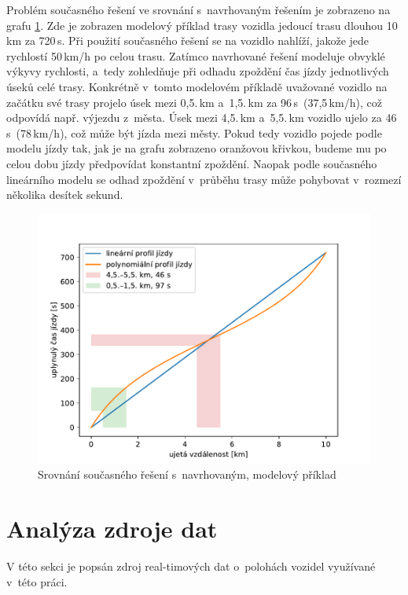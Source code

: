\bigbreak

Problém současného řešení ve srovnání s~navrhovaným řešením je zobrazeno na grafu \ref{fig:lin_vs_poly}. Zde je zobrazen modelový příklad trasy vozidla jedoucí trasu dlouhou 10\,km za 720\,s. Při použití současného řešení se na vozidlo nahlíží, jakože jede rychlostí 50\,km/h po celou trasu. Zatímco navrhované řešení modeluje obvyklé výkyvy rychlosti, a~tedy zohledňuje při odhadu zpoždění čas jízdy jednotlivých úseků celé trasy. Konkrétně v~tomto modelovém příkladě uvažované vozidlo na začátku své trasy projelo úsek mezi 0,5.\,km a~1,5.\,km za 96\,s~(37,5\,km/h), což odpovídá např. výjezdu z~města. Úsek mezi 4,5.\,km a~5,5.\,km vozidlo ujelo za 46\,s~(78\,km/h), což může být jízda mezi městy. Pokud tedy vozidlo pojede podle modelu jízdy tak, jak je na grafu zobrazeno oranžovou křivkou, budeme mu po celou dobu jízdy předpovídat konstantní zpoždění. Naopak podle současného lineárního modelu se odhad zpoždění v~průběhu trasy může pohybovat v~rozmezí několika desítek sekund.

\begin{figure}
	\centering
  \includegraphics[width=\linewidth]{../img/lin_vs_poly}
  \caption{Srovnání současného řešení s~navrhovaným, modelový příklad}
  \label{fig:lin_vs_poly}
\end{figure}

\section{Analýza zdroje dat} \label{chapter:analyza_zdroje}

V této sekci je popsán zdroj real-timových dat o~polohách vozidel využívané v~této práci.

